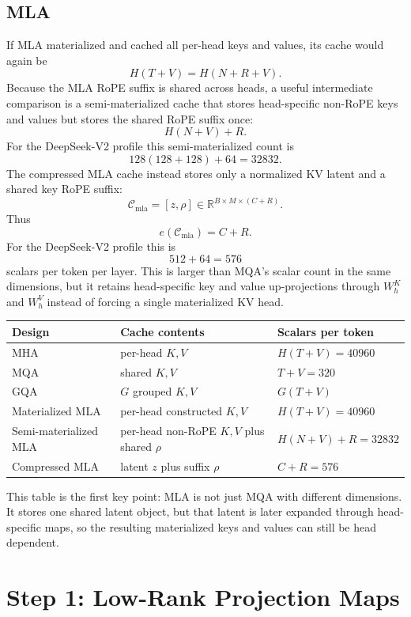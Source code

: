 \documentclass[11pt]{article}
\newcommand{\R}{\mathbb{R}}
\newcommand{\cache}{\mathcal{C}}
\begin{document}
\subsection{MLA}

If MLA materialized and cached all per-head keys and values, its cache would
again be
\[
  H(T+V)=H(N+R+V).
\]
Because the MLA RoPE suffix is shared across heads, a useful intermediate
comparison is a semi-materialized cache that stores head-specific non-RoPE keys
and values but stores the shared RoPE suffix once:
\[
  H(N+V)+R.
\]
For the DeepSeek-V2 profile this semi-materialized count is
\[
  128(128+128)+64=32832.
\]
The compressed MLA cache instead stores only a normalized KV latent and a shared
key RoPE suffix:
\[
  \cache_{\mathrm{mla}}
  =
  [z,\rho]
  \in\R^{B\times M\times(C+R)}.
\]
Thus
\[
  e(\cache_{\mathrm{mla}})=C+R.
\]
For the DeepSeek-V2 profile this is
\[
  512+64=576
\]
scalars per token per layer.  This is larger than MQA's scalar count in the same
dimensions, but it retains head-specific key and value up-projections through
$W^K_h$ and $W^V_h$ instead of forcing a single materialized KV head.

\begin{center}
\small
\begin{tabular}{lll}
\toprule
Design & Cache contents & Scalars per token \\
\midrule
MHA & per-head $K,V$ & $H(T+V)=40960$ \\
MQA & shared $K,V$ & $T+V=320$ \\
GQA & $G$ grouped $K,V$ & $G(T+V)$ \\
Materialized MLA & per-head constructed $K,V$ & $H(T+V)=40960$ \\
Semi-materialized MLA & per-head non-RoPE $K,V$ plus shared $\rho$ & $H(N+V)+R=32832$ \\
Compressed MLA & latent $z$ plus suffix $\rho$ & $C+R=576$ \\
\bottomrule
\end{tabular}
\end{center}

This table is the first key point: MLA is not just MQA with different
dimensions.  It stores one shared latent object, but that latent is later
expanded through head-specific maps, so the resulting materialized keys and
values can still be head dependent.

\section{Step 1: Low-Rank Projection Maps}
\end{document}
